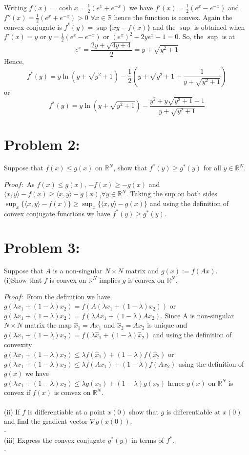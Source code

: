 \documentclass[12pt]{report}
\begin{document}
Writing $f(x)=\cosh x = \frac{1}{2}(e^x+e^{-x})$ we have $f'(x)=\frac{1}{2}(e^x-e^{-x})$ and $f''(x)=\frac{1}{2}(e^x+e^{-x})>0$ 
$\forall x\in \mathbb{R}$ hence the function is convex. Again the convex conjugate is $f^*(y)=\sup\{xy-f(x)\}$ and the $\sup$ is
obtained when $f'(x)=y$ or $y=\frac{1}{2}(e^x-e^{-x})$ or $(e^x)^2-2ye^x-1=0$. So, the $\sup$ is at
$$e^x= \frac{2y+\sqrt{4y+4}}{2} = y+\sqrt{y^2+1} $$ Hence, 
$$ f^*(y) = y \ln(y+\sqrt{y^2+1})  - \frac{1}{2}\left(y+\sqrt{y^2+1}+\frac{1}{y+\sqrt{y^2+1}} \right)  $$ or
$$ f^*(y) = y \ln(y+\sqrt{y^2+1}) - \frac{y^2+y\sqrt{y^2+1}+1}{y+\sqrt{y^2+1}} $$

\section*{Problem 2:}
Suppose that $f(x) \leq g(x)$ on $\mathbb{R}^N$, show that $f^*(y) \geq g^*(y)$ for all $y \in \mathbb{R}^N$.

$Proof:$ As $f(x) \leq g(x)$, $-f(x) \geq -g(x)$ and
$\langle x, y \rangle -f(x) \geq \langle x, y \rangle -g(x)$,$\forall y\in\mathbb{R}^N$. Taking the sup on both
sides $\sup_x\{\langle x,y \rangle-f(x)\} \geq \sup_x\{\langle x,y \rangle-g(x)\}$ and using the definition of convex conjugate
functions we have $f^*(y) \geq g^*(y)$.

\section*{Problem 3:}
Suppose that $A$ is a non-singular $N \times N$ matrix and $g(x) := f(Ax)$.\\
(i)Show that $f$ is convex on $\mathbb{R}^N$ implies $g$ is convex on $\mathbb{R}^N$.

$Proof:$ From the definition we have \\ $g(\lambda x_1+(1-\lambda )x_2) = f(A(\lambda x_1+(1-\lambda )x_2))$ or \\
$g(\lambda x_1+(1-\lambda )x_2) = f(\lambda Ax_1+(1-\lambda )Ax_2)$. Since A is non-singular $N \times N$ matrix the map
$\hat{x}_1=A x_1$ and $\hat{x}_2=A x_2$ is unique and \\
$g(\lambda x_1+(1-\lambda )x_2) = f(\lambda \hat{x}_1+(1-\lambda )\hat{x}_2)$ and using the definition of convexity \\
$g(\lambda x_1+(1-\lambda )x_2) \leq \lambda f(\hat{x}_1)+(1-\lambda )f(\hat{x}_2)$ or \\
$g(\lambda x_1+(1-\lambda )x_2) \leq \lambda f(Ax_1)+(1-\lambda )f(Ax_2)$ using the definition of $g(x)$ we have \\
$g(\lambda x_1+(1-\lambda )x_2) \leq \lambda g(x_1)+(1-\lambda )g(x_2)$ hence $g(x)$ on $\mathbb{R}^N$ is convex 
if $f(x)$ is convex on $\mathbb{R}^N$.
\\ \\
(ii) If $f$ is differentiable at a point $x(0)$ show that $g$ is differentiable at $x(0)$ and find the gradient vector 
$\nabla g(x(0))$.
\\-\\
(iii) Express the convex conjugate $g^*(y)$ in terms of $f^*$.\\-
\end{document}
